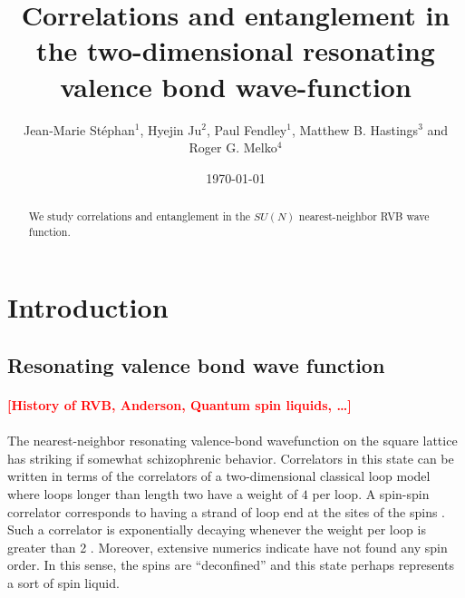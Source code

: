 \documentclass[11pt]{iopart}
\begin{document}
 
\title[Correlations and entanglement in the 2D RVB wave function]{Correlations and entanglement in the two-dimensional resonating valence bond wave-function}
 
\author{Jean-Marie St\'ephan$^1$, Hyejin Ju$^2$, Paul Fendley$^1$, Matthew B. Hastings$^3$ and Roger G. Melko$^4$}

\address{$^1$ Physics Department, University of Virginia, Charlottesville, VA 22904-4714}

\address{$^2$ Department of Physics, University of California, Santa Barbara, CA, 93106-9530}

\address{$^3$ Microsoft Research, Station Q, CNSI Building, University of California, Santa Barbara, CA, 93106-9530}

\address{$^4$ Department of Physics and Astronomy, University of Waterloo, Ontario, N2L 3G1, Canada}


\date{\today}
\begin{abstract}
 We study correlations and entanglement in the $SU(N)$ nearest-neighbor RVB wave function.
\end{abstract}
\maketitle




\section{Introduction}
\subsection{Resonating valence bond wave function}
\paragraph{}\textcolor{red}{\bf [History of RVB, Anderson, Quantum spin liquids, \ldots]}

\paragraph{}


The nearest-neighbor resonating valence-bond wavefunction on the square lattice has striking if somewhat schizophrenic behavior. Correlators in this state can be written in terms of the correlators of a two-dimensional classical loop model where loops longer than length two have a weight of $4$ per loop. A spin-spin correlator corresponds to having a strand of loop end at the sites of the spins \cite{Doucot}. Such a correlator is exponentially decaying  whenever the weight per loop is greater than 2 \cite{Nienhuis}.  Moreover, extensive numerics indicate \cite{RVB1,RVB2} have not found any  spin order. In this sense, the spins are ``deconfined'' and this state perhaps represents a sort of spin liquid.
\end{document}
